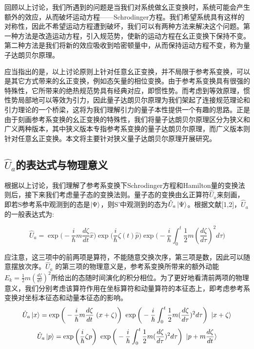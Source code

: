 \documentclass[a4paper]{article}
\begin{document}
        回顾以上讨论，我们所遇到的问题是当我们对系统做幺正变换时，系统可能会产生额外的效应，从而破坏运动方程——Schrodinger方程。我们希望系统具有这样的对称性，因此不希望运动方程遭到破坏，我们可以有两种方法来解决这个问题。第一种方法是改造运动方程，引入规范势，使新的运动方程在幺正变换下保持不变。第二种方法是我们将新的效应吸收到哈密顿量中，从而保持运动方程不变，称为量子达朗贝尔原理。

        应当指出的是，以上讨论原则上针对任意幺正变换，并不局限于参考系变换，可以是其它方式带来的幺正变换，例如态矢量的相位变换。由于参考系变换具有很强的特殊性，它所带来的绝热规范势具有经典对应，即惯性势。而考虑到等效原理，惯性势局部地可以等效为引力，因此量子达朗贝尔原理为我们架起了连接规范理论和引力理论的一个桥梁，这将为我们理解引力的量子本性提供一个有趣的思路。正是由于刻画参考系变换的幺正变换的特殊性，我们将量子达朗贝尔原理区分为狭义和广义两种版本，其中狭义版本专指参考系变换的量子达朗贝尔原理，而广义版本则针对任意幺正变换。本文将主要针对狭义量子达朗贝尔原理开展研究。

    \subsection{$\hat{U}_a$的表达式与物理意义}

        根据以上讨论，我们理解了参考系变换下Schrodinger方程和Hamilton量的变换法则后，接下来我们考虑量子态的变换法则。量子态的变换由幺正算符$\hat{U}_a$来刻画，即若S参考系中观测到的态是$\ket{\Psi}$，则S’中观测到的态为$\hat{U}_a\ket{\Psi}$。根据文献[1,2]，$\hat{U}_a$的一般表达式为:
    
        \begin{equation}
            \hat{U}_a=\exp\bigg(-\frac{i}{\hbar} m \frac{d \zeta}{dt} \hat{x}\bigg) \exp\bigg({\frac{i}{\hbar}\zeta(t) \hat{p}}\bigg) \exp\bigg(-\frac{i}{\hbar}\int_0^t\frac{1}{2}m(\frac{d \zeta}{d\tau})^2 d\tau\bigg)
        \end{equation}
        
        应注意，这三项中的前两项是算符，不能随意交换次序，第三项是数，因此可以随意摆放次序。$\hat{U}_a$ 的第三项的物理意义是，参考系变换所带来的额外动能$E_k=\frac{1}{2}m(\frac{d \zeta}{d\tau})^2$所给出的态随时间演化的积分相位。为了更好地看清前两项的物理意义，我们分别考虑该算符作用在坐标算符和动量算符的本征态上，即考虑参考系变换对坐标本征态和动量本征态的影响。
        \begin{equation}
            \hat{U}_a \ket{x} = \exp\bigg(-\frac{i}{\hbar}m\frac{d \zeta}{dt}\ (x+\zeta)\bigg)\ \exp\bigg(-\frac{i}{\hbar}\int_0^t\frac{1}{2}m(\frac{d \zeta}{d\tau})^2 d\tau \bigg)\ \ket{x+\zeta}
        \end{equation}
        \begin{equation}
            \hat{U}_a \ket{p} = \exp\bigg(\frac{i}{\hbar}\zeta p \bigg)\ \exp\bigg(-\frac{i}{\hbar}\int_0^t\frac{1}{2}m(\frac{d \zeta}{d\tau})^2 d\tau \bigg)\ \ket{p+m\frac{d \zeta}{dt}}
        \end{equation}
\end{document}
